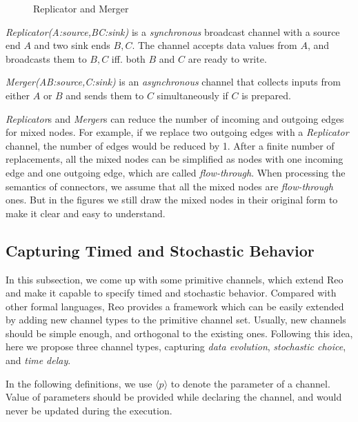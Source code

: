 \begin{figure}[H]
    \centering
    
    \caption{Replicator and Merger}
\end{figure}

\begin{description}
    \item \emph{Replicator(A:source,B\:C:sink)} is a \emph{synchronous} broadcast channel with a source end $A$ and two sink ends $B,C$. The channel accepts data values from $A$, and broadcasts them to $B,C$ iff. both $B$ and $C$ are ready to write.
    \item \emph{Merger(A\:B:source,C:sink)}
    is an \emph{asynchronous} channel that collects inputs from either $A$ or $B$ and sends them to $C$ simultaneously if $C$ is prepared.
\end{description}

\emph{Replicator}s and \emph{Merger}s can reduce the number of incoming and outgoing edges for mixed nodes. For example, if we replace two outgoing edges with a \emph{Replicator} channel, the number of edges would be reduced by 1. After a finite number of replacements, all the mixed nodes can be simplified as nodes with one incoming edge and one outgoing edge, which are called \emph{flow-through}.
When processing the semantics of connectors, we assume that all the mixed nodes are \emph{flow-through} ones. But in the figures we still draw the mixed nodes in their original form to make it clear and easy to understand.

\subsection{Capturing Timed and Stochastic Behavior}

In this subsection, we come up with some primitive channels, which extend Reo and make it capable to specify timed and stochastic behavior.
Compared with other formal languages, Reo provides a framework which can be easily extended by adding new channel types to the primitive channel set. Usually, new channels should be simple enough, and orthogonal to the existing ones. Following this idea, here we propose three channel types, capturing \emph{data evolution}, \emph{stochastic choice}, and \emph{time delay}.

In the following definitions, we use $\langle p \rangle$ to denote the parameter of a channel. Value of parameters should be provided while declaring the channel, and would never be updated during the execution.

